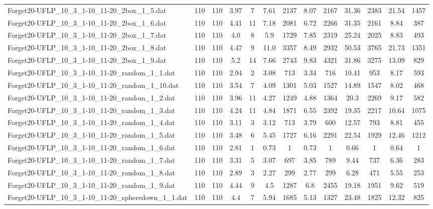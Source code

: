 \begin{table}[!ht]
{\begin{tabular}{lcccccccccccc}
Forget20-UFLP\_10\_3\_1-10\_11-20\_2box\_1\_5.dat & 110 & 110 & 3.97 & 7 & 7.61 & 2137 & 8.07 & 2167 & 31.36 & 2383 & 21.54 & 1457 \\
Forget20-UFLP\_10\_3\_1-10\_11-20\_2box\_1\_6.dat & 110 & 110 & 4.41 & 11 & 7.18 & 2081 & 6.72 & 2266 & 31.35 & 2161 & 8.84 & 387 \\
Forget20-UFLP\_10\_3\_1-10\_11-20\_2box\_1\_7.dat & 110 & 110 & 4.0 & 8 & 5.9 & 1729 & 7.85 & 2319 & 25.24 & 2025 & 8.83 & 493 \\
Forget20-UFLP\_10\_3\_1-10\_11-20\_2box\_1\_8.dat & 110 & 110 & 4.47 & 9 & 11.0 & 3357 & 8.49 & 2932 & 50.53 & 3765 & 21.73 & 1351 \\
Forget20-UFLP\_10\_3\_1-10\_11-20\_2box\_1\_9.dat & 110 & 110 & 5.2 & 14 & 7.66 & 2743 & 9.83 & 4321 & 31.86 & 3275 & 13.09 & 829 \\
Forget20-UFLP\_10\_3\_1-10\_11-20\_random\_1\_1.dat & 110 & 110 & 2.94 & 2 & 3.08 & 713 & 3.34 & 716 & 10.41 & 953 & 8.17 & 593 \\
Forget20-UFLP\_10\_3\_1-10\_11-20\_random\_1\_10.dat & 110 & 110 & 3.54 & 7 & 4.09 & 1301 & 5.03 & 1527 & 14.89 & 1547 & 8.02 & 468 \\
Forget20-UFLP\_10\_3\_1-10\_11-20\_random\_1\_2.dat & 110 & 110 & 3.96 & 11 & 4.27 & 1249 & 4.88 & 1364 & 20.3 & 2269 & 9.17 & 582 \\
Forget20-UFLP\_10\_3\_1-10\_11-20\_random\_1\_3.dat & 110 & 110 & 4.24 & 11 & 4.84 & 1871 & 6.55 & 2392 & 19.35 & 2217 & 10.64 & 1075 \\
Forget20-UFLP\_10\_3\_1-10\_11-20\_random\_1\_4.dat & 110 & 110 & 3.11 & 3 & 3.12 & 713 & 3.79 & 600 & 12.57 & 793 & 8.81 & 455 \\
Forget20-UFLP\_10\_3\_1-10\_11-20\_random\_1\_5.dat & 110 & 110 & 3.48 & 6 & 5.45 & 1727 & 6.16 & 2291 & 22.54 & 1929 & 12.46 & 1212 \\
Forget20-UFLP\_10\_3\_1-10\_11-20\_random\_1\_6.dat & 110 & 110 & 2.81 & 1 & 0.73 & 1 & 0.73 & 1 & 0.66 & 1 & 0.64 & 1 \\
Forget20-UFLP\_10\_3\_1-10\_11-20\_random\_1\_7.dat & 110 & 110 & 3.31 & 5 & 3.07 & 697 & 3.85 & 789 & 9.44 & 737 & 6.36 & 283 \\
Forget20-UFLP\_10\_3\_1-10\_11-20\_random\_1\_8.dat & 110 & 110 & 2.89 & 3 & 2.27 & 299 & 2.77 & 299 & 6.28 & 471 & 5.55 & 253 \\
Forget20-UFLP\_10\_3\_1-10\_11-20\_random\_1\_9.dat & 110 & 110 & 4.44 & 9 & 4.5 & 1287 & 6.8 & 2455 & 19.18 & 1951 & 9.62 & 519 \\
Forget20-UFLP\_10\_3\_1-10\_11-20\_spheredown\_1\_1.dat & 110 & 110 & 4.4 & 7 & 5.94 & 1685 & 5.13 & 1327 & 23.48 & 1825 & 12.32 & 825 \\

\end{tabular}}
\end{table}
